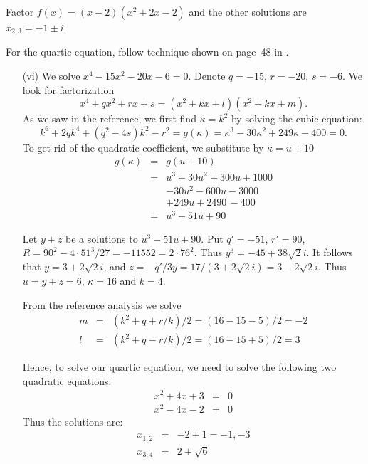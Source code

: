 \begin{myenumerate}
\begin{itemize}
   Factor \(f(x)=(x-2)(x^2+2x-2)\)
   and the other solutions are \(x_{2,3}=-1\pm i\).
\end{itemize}

For the quartic equation,
follow technique shown on page~48 in \cite{Rotman98}.
\begin{itemize}

 \item[(vi)]
  We solve \(x^4 - 15x^2 -20x - 6= 0\).
  Denote \(q=-15\), \(r=-20\), \(s=-6\).
  We look for factorization
  \begin{equation*}
    x^4+qx^2+rx+s = (x^2+kx+l)(x^2+kx+m).
  \end{equation*}
  As we saw in the reference, we first find \(\kappa=k^2\)
  by solving the cubic equation:
  \begin{equation*}
  k^6 + 2qk^4 + (q^2-4s)k^2 - r^2 = g(\kappa) =
    \kappa^3 - 30\kappa^2 + 249\kappa - 400 = 0.
  \end{equation*}
  To get rid of the quadratic coefficient, we substitute
  by \(\kappa=u+10\)
  \begin{eqnarray*}
   g(\kappa) & = & g(u+10) \\
    & = & u^3 + 30u^2 + 300u + 1000 \\
    &   &     - 30u^2 - 600u - 3000 \\
    &   &             + 249u + 2490 \, - 400 \\
    & = & u^3         -  51u + 90
  \end{eqnarray*}

  Let \(y+z\) be a solutions to \(u^3-51u+90\).
  Put \(q'=-51\), \(r'=90\), \(R=90^2-4\cdot 51^3/27=-11552=2\cdot76^2\).
  Thus \(y^3=-45+38\sqrt{2}i\).
  It follows that \(y=3+2\sqrt{2}i\),
  and \(z = -q'/3y = 17/(3+2\sqrt{2}i) = 3-2\sqrt{2}i\).
  Thus \(u=y+z=6\), \(\kappa=16\) and \(k=4\).

  From the reference analysis we solve
  \begin{eqnarray*}
  m & = & \left(k^2+q+r/k\right)/2 = (16 - 15 - 5)/2 = -2 \\
  l & = & \left(k^2+q-r/k\right)/2 = (16 - 15 + 5)/2 = 3
  \end{eqnarray*}

  Hence, to solve our quartic equation, we need to solve the following
  two quadratic equations:
  \begin{eqnarray*}
  x^2 + 4x + 3 & = & 0 \\
  x^2 - 4x - 2 & = & 0
  \end{eqnarray*}
  Thus the solutions are:
  \begin{eqnarray*}
    x_{1,2} & = & -2 \pm 1 = -1, -3 \\
    x_{3,4} & = & 2 \pm \sqrt{6}
  \end{eqnarray*}
\end{itemize}


\end{myenumerate}


